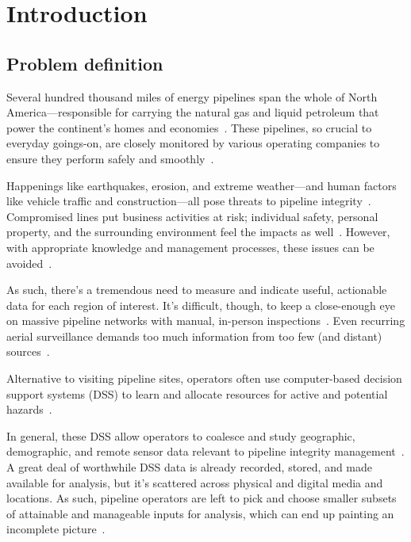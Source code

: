 \chapter{Introduction}
\label{intro}

\section{Problem definition}
\label{Problem}
Several hundred thousand miles of energy pipelines span the whole of North America---responsible for carrying the natural gas and liquid petroleum that power the continent's homes and economies~\cite{PHMSA}. These pipelines, so crucial to everyday goings-on, are closely monitored by various operating companies to ensure they perform safely and smoothly~\cite{PHMSA2013}.

Happenings like earthquakes, erosion, and extreme weather---and human factors like vehicle traffic and construction---all pose threats to pipeline integrity~\cite{MichaelBakerJr.2008,Chastain,Dunning2013}. Compromised lines put business activities at risk; individual safety, personal property, and the surrounding environment feel the impacts as well~\cite{Dunning2013}. However, with appropriate knowledge and management processes, these issues can be avoided~\cite{Dunning2013,Chastain}.

As such, there's a tremendous need to measure and indicate useful, actionable data for each region of interest. It's difficult, though, to keep a close-enough eye on massive pipeline networks with manual, in-person inspections~\cite{Dunning2013,Chastain}. Even recurring aerial surveillance demands too much information from too few (and distant) sources~\cite{Dunning2013}.

Alternative to visiting pipeline sites, operators often use computer-based decision support systems (DSS) to learn and allocate resources for active and potential hazards~\cite{PHMSA2013,Dunning2013}. 

In general, these DSS allow operators to coalesce and study geographic, demographic, and remote sensor data relevant to pipeline integrity management~\cite{RedlandsSDSS,Dunning2013}. A great deal of worthwhile DSS data is already recorded, stored, and made available for analysis, but it's scattered across physical and digital media and locations. As such, pipeline operators are left to pick and choose smaller subsets of attainable and manageable inputs for analysis, which can end up painting an incomplete picture~\cite{Dunning2013}.

